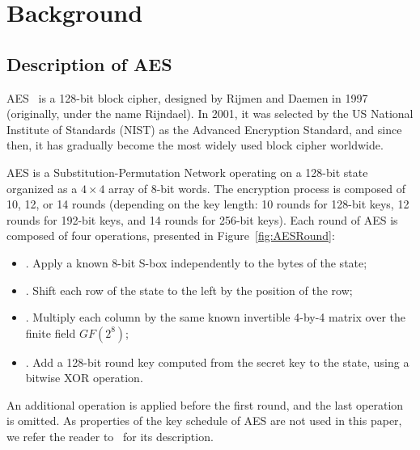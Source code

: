 \section{Background}\label{sec:background}

\subsection{Description of AES}\label{sub:description_cipher}

AES~\cite{AES} is a 128-bit block cipher, designed by Rijmen and Daemen in 1997 (originally, under the name Rijndael). In 2001, it was selected by the US National Institute of Standards (NIST) as the Advanced Encryption Standard, and since then, it has gradually become the most widely used block cipher worldwide. 

AES is a Substitution-Permutation Network operating on a 128-bit state organized as a $4\times4$ array of 8-bit words. The encryption process is composed of 10, 12, or 14 rounds (depending on the key length: 10 rounds for 128-bit keys, 12 rounds for 192-bit keys, and 14 rounds for 256-bit keys). Each round of AES is composed of four operations, presented in Figure~\ref{fig:AESRound}: 
\begin{itemize}[leftmargin=.02in]
    \item[] \textbf{\subB}. Apply a known 8-bit S-box independently to the bytes of the state; 
    \item[] \textbf{\sr}. Shift each row of the state to the left by the position of the row;
    \item[] \textbf{\mc}. Multiply each column by the same known invertible 4-by-4 matrix over the finite field $GF(2^8)$;
    \item[] \textbf{\ak}. Add a 128-bit round key computed from the secret key to the state, using a bitwise XOR operation.
\end{itemize}
An additional \ak operation is applied before the first round, and
the last \mc operation is omitted. As properties of the key schedule of AES are not used in this paper, we refer the reader to~\cite{AES} for its description.

